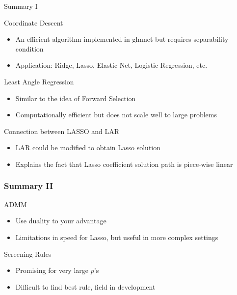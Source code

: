 \documentclass{beamer}
\begin{document}
\begin{frame}{Summary I}
\begin{block}{Coordinate Descent}
\begin{itemize}
    \item An efficient algorithm implemented in glmnet but requires separability condition
    \item Application: Ridge, Lasso, Elastic Net, Logistic Regression, etc.
\end{itemize}
\begin{block}{Least Angle Regression }
\begin{itemize}
    \item Similar to the idea of Forward Selection 
    \item Computationally efficient but does not scale well to large problems
\end{itemize}
\begin{block}{Connection between LASSO and LAR}
\begin{itemize}
    \item LAR could be modified to obtain Lasso solution 
    \item Explains the fact that Lasso coefficient solution path is piece-wise linear
\end{itemize}

\end{block}

\end{block}

\end{block}
\end{frame}

\begin{frame}
\frametitle{Summary II}
\begin{block}{ADMM}
\begin{itemize}
	\item Use duality to your advantage
	\item Limitations in speed for Lasso, but useful in more complex settings
\end{itemize}
\begin{block}{Screening Rules}
\begin{itemize}
    \item Promising for very large $p$'s 
    \item Difficult to find best rule, field in development
\end{itemize}


\end{block}


\end{block}

\end{frame}
\end{document}
